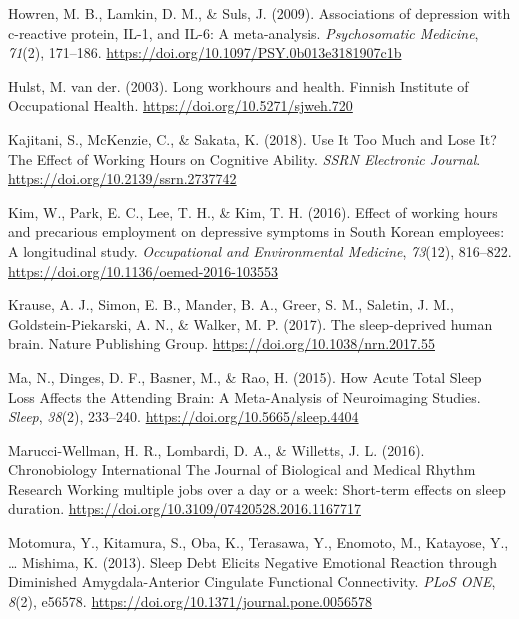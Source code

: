 \documentclass[
  english,
  man]{apa6}
\newlength{\cslhangindent}
\newenvironment{cslreferences}%
  {\setlength{\parindent}{0pt}%
  \everypar{\setlength{\hangindent}{\cslhangindent}}\ignorespaces}%
  {\par}
\begin{document}
\begin{cslreferences}
\leavevmode\hypertarget{ref-Howren2009}{}%
Howren, M. B., Lamkin, D. M., \& Suls, J. (2009). Associations of depression with c-reactive protein, IL-1, and IL-6: A meta-analysis. \emph{Psychosomatic Medicine}, \emph{71}(2), 171--186. \url{https://doi.org/10.1097/PSY.0b013e3181907c1b}

\leavevmode\hypertarget{ref-VanderHulst2003}{}%
Hulst, M. van der. (2003). Long workhours and health. Finnish Institute of Occupational Health. \url{https://doi.org/10.5271/sjweh.720}

\leavevmode\hypertarget{ref-Kajitani2018}{}%
Kajitani, S., McKenzie, C., \& Sakata, K. (2018). Use It Too Much and Lose It? The Effect of Working Hours on Cognitive Ability. \emph{SSRN Electronic Journal}. \url{https://doi.org/10.2139/ssrn.2737742}

\leavevmode\hypertarget{ref-Kim2016}{}%
Kim, W., Park, E. C., Lee, T. H., \& Kim, T. H. (2016). Effect of working hours and precarious employment on depressive symptoms in South Korean employees: A longitudinal study. \emph{Occupational and Environmental Medicine}, \emph{73}(12), 816--822. \url{https://doi.org/10.1136/oemed-2016-103553}

\leavevmode\hypertarget{ref-Krause2017}{}%
Krause, A. J., Simon, E. B., Mander, B. A., Greer, S. M., Saletin, J. M., Goldstein-Piekarski, A. N., \& Walker, M. P. (2017). The sleep-deprived human brain. Nature Publishing Group. \url{https://doi.org/10.1038/nrn.2017.55}

\leavevmode\hypertarget{ref-Ma2015}{}%
Ma, N., Dinges, D. F., Basner, M., \& Rao, H. (2015). How Acute Total Sleep Loss Affects the Attending Brain: A Meta-Analysis of Neuroimaging Studies. \emph{Sleep}, \emph{38}(2), 233--240. \url{https://doi.org/10.5665/sleep.4404}

\leavevmode\hypertarget{ref-Marucci-Wellman2016}{}%
Marucci-Wellman, H. R., Lombardi, D. A., \& Willetts, J. L. (2016). Chronobiology International The Journal of Biological and Medical Rhythm Research Working multiple jobs over a day or a week: Short-term effects on sleep duration. \url{https://doi.org/10.3109/07420528.2016.1167717}

\leavevmode\hypertarget{ref-Motomura2013}{}%
Motomura, Y., Kitamura, S., Oba, K., Terasawa, Y., Enomoto, M., Katayose, Y., \ldots{} Mishima, K. (2013). Sleep Debt Elicits Negative Emotional Reaction through Diminished Amygdala-Anterior Cingulate Functional Connectivity. \emph{PLoS ONE}, \emph{8}(2), e56578. \url{https://doi.org/10.1371/journal.pone.0056578}


\end{cslreferences}
\end{document}

